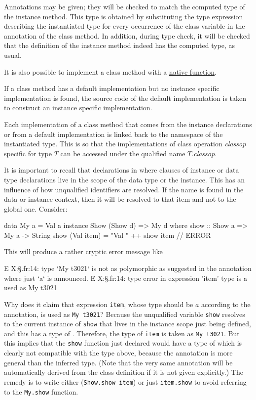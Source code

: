 Annotations may be given; they will be checked to match the computed type of the instance method.
This type is obtained by substituting the type expression describing the instantiated type for every occurrence of the class variable in the annotation of the class method. In addition, during type check, it will be checked that the definition of the instance method indeed has the computed type, as usual.

It is also possible to implement a class method with a \hyperref[nativefun]{native function}.

If a class method has a default implementation but no instance specific implementation is found, the source code of the default implementation is taken to construct an instance specific implementation.

Each implementation of a class method that comes from the instance declarations or from a default implementation is linked back to the namespace of the instantiated type. This is so that the implementations of class operation \emph{classop} specific for type $T$ can be accessed under the qualified name $T$.\emph{classop}.

It is important to recall that declarations in where clauses of instance or data type declarations live in the scope of the data type or the instance. This has an influence of how unqualified identifiers are resolved. If the name is found in the data or instance context, then it will be resolved to that item and not to the global one. Consider:

\begin{code}
data My a = Val a
instance Show (Show d) => My d where
    show :: Show a => My a -> String 
    show (Val item) = "Val " ++ show item // ERROR
\end{code}

This will produce a rather cryptic error message like
\begin{code}
E X:\dev\frege\S.fr:14: type  `My t3021` is not as polymorphic
                as suggested  in the annotation where just  `a`
                is announced.
E X:\dev\frege\S.fr:14: type error in expression 'item'
        type is  a
        used as  My t3021
\end{code}

Why does it claim that expression \texttt{item}, whose type should be $a$ according to the annotation, is used as \texttt{My t3021}? Because the unqualified variable \texttt{show} resolves to the current instance of \texttt{show} that lives in the instance scope just being defined, and this has a type of .
Therefore, the type of \texttt{item} is taken as \texttt{My t3021}. But this implies that the \texttt{show} function just declared would have a type of 
which is clearly not compatible with the type above, because the annotation is more general than the inferred type. (Note that the very same annotation will be automatically derived from the class definition if it is not given explicitly.)
The remedy is to write either (\texttt{Show.show item}) or just \texttt{item.show} to avoid referring to the \texttt{My.show} function.

